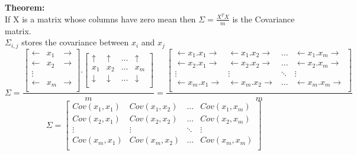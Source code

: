 \documentclass{article}
\begin{document}
\textbf{Theorem:}\\
If X is a matrix whose columns have zero mean then $\Sigma=\frac{X^TX}{m}$ is the Covariance matrix.\\
$\Sigma_{i,j}$ stores the covariance between $x_i$ and $x_j$
$$
  \Sigma=\frac{\begin{bmatrix}
      \mathbf{\longleftarrow} & x_1 & \mathbf{\longrightarrow} \\
      \mathbf{\longleftarrow} & x_2 & \mathbf{\longrightarrow} \\
      \vdots\\
      \mathbf{\longleftarrow} & x_m & \mathbf{\longrightarrow} \\
    \end{bmatrix}.\begin{bmatrix}
      \uparrow   & \uparrow   & \dots & \uparrow   \\
      x_1        & x_2        & \dots & x_m        \\
      \downarrow & \downarrow & \dots & \downarrow \\
    \end{bmatrix}}{m}=\frac{\begin{bmatrix}
      \mathbf{\longleftarrow}x_1.x_1\mathbf{\longrightarrow} & \mathbf{\longleftarrow}x_1.x_2\mathbf{\longrightarrow} & \dots  & \mathbf{\longleftarrow}x_1.x_m\mathbf{\longrightarrow} \\
      \mathbf{\longleftarrow}x_2.x_1\mathbf{\longrightarrow} & \mathbf{\longleftarrow}x_2.x_2\mathbf{\longrightarrow} & \dots  & \mathbf{\longleftarrow}x_2.x_m\mathbf{\longrightarrow} \\
      \vdots                                                 & \vdots                                                 & \ddots & \vdots                                                 \\
      \mathbf{\longleftarrow}x_m.x_1\mathbf{\longrightarrow} & \mathbf{\longleftarrow}x_m.x_2\mathbf{\longrightarrow} & \dots  & \mathbf{\longleftarrow}x_m.x_m\mathbf{\longrightarrow} \\
    \end{bmatrix}}{m}
$$
$$
  \Sigma=\begin{bmatrix}
    Cov(x_1,x_1) & Cov(x_1,x_2) & \dots  & Cov(x_1,x_m) \\
    Cov(x_2,x_1) & Cov(x_2,x_2) & \dots  & Cov(x_2,x_m) \\
    \vdots       & \vdots       & \ddots & \vdots       \\
    Cov(x_m,x_1) & Cov(x_m,x_2) & \dots  & Cov(x_m,x_m) \\
  \end{bmatrix}
$$
\pagebreak
\end{document}
